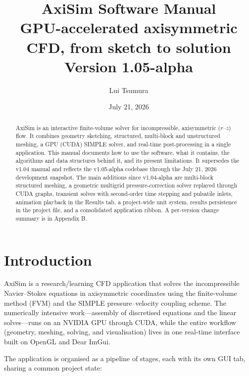 \documentclass[11pt]{article}
\title{\textbf{AxiSim Software Manual} \\[2pt] \large GPU-accelerated axisymmetric CFD, from sketch to solution \\[6pt] \normalsize Version 1.05-alpha}
\author{Lui Tsumura}
\date{July 21, 2026}
\begin{document}
\maketitle

\begin{abstract}
\noindent AxiSim is an interactive finite-volume solver for incompressible, axisymmetric
(\(r\text{--}z\)) flow. It combines geometry sketching, structured, multi-block and
unstructured meshing, a GPU (CUDA) SIMPLE solver, and real-time post-processing in a
single application. This manual documents how to use the software, what it contains,
the algorithms and data structures behind it, and its present limitations. It supersedes
the v1.04 manual and reflects the v1.05-alpha codebase through the July 21, 2026
development snapshot. The main additions since v1.04-alpha are multi-block structured
meshing, a geometric multigrid pressure-correction solver replayed through CUDA graphs,
transient solves with second-order time stepping and pulsatile inlets, animation
playback in the Results tab, a project-wide unit system, results persistence in the
project file, and a consolidated application ribbon. A per-version change summary is in Appendix B.
\end{abstract}

\tableofcontents
\newpage

\section{Introduction}
AxiSim is a research/learning CFD application that solves the incompressible
Navier--Stokes equations in axisymmetric coordinates using the finite-volume method
(FVM) and the SIMPLE pressure--velocity coupling scheme. The numerically intensive
work---assembly of discretised equations and the linear solves---runs on an NVIDIA GPU
through CUDA, while the entire workflow (geometry, meshing, solving, and visualisation)
lives in one real-time interface built on OpenGL and Dear ImGui.

The application is organised as a pipeline of stages, each with its own GUI tab, sharing
a common project state:
\end{document}

